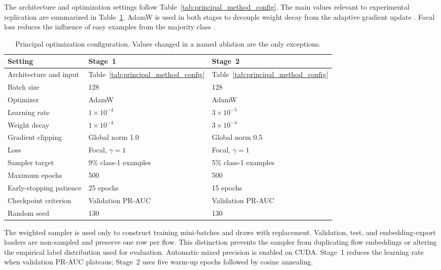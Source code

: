 The architecture and optimization settings follow
Table~\ref{tab:principal_method_config}. The main values relevant to
experimental replication are summarized in
Table~\ref{tab:experimental_training_config}. AdamW is used in both stages to
decouple weight decay from the adaptive gradient update
\cite{Loshchilov2019AdamW}. Focal loss reduces the influence of easy examples
from the majority class \cite{Lin2017FocalLoss}.

\begin{table}[t]
    \centering
    \caption{Principal optimization configuration. Values changed in a named
    ablation are the only exceptions.}
    \label{tab:experimental_training_config}
    \begin{tabular}{@{}p{3.0cm}p{4.6cm}p{5.7cm}@{}}
        \toprule
        Setting & Stage~1 & Stage~2 \\
        \midrule
        Architecture and input & Table~\ref{tab:principal_method_config} &
        Table~\ref{tab:principal_method_config} \\
        Batch size & 128 & 128 \\
        Optimizer & AdamW & AdamW \\
        Learning rate & $1\times10^{-4}$ & $3\times10^{-5}$ \\
        Weight decay & $1\times10^{-4}$ & $3\times10^{-4}$ \\
        Gradient clipping & Global norm 1.0 & Global norm 0.5 \\
        Loss & Focal, $\gamma=1$ & Focal, $\gamma=1$ \\
        Sampler target & 9\% class-1 examples & 5\% class-1 examples \\
        Maximum epochs & 500 & 500 \\
        Early-stopping patience & 25 epochs & 15 epochs \\
        Checkpoint criterion & Validation PR-AUC & Validation PR-AUC \\
        Random seed & 130 & 130 \\
        \bottomrule
    \end{tabular}
\end{table}

The weighted sampler is used only to construct training mini-batches and draws
with replacement. Validation, test, and embedding-export loaders are
non-sampled and preserve one row per flow. This distinction prevents the
sampler from duplicating flow embeddings or altering the empirical label
distribution used for evaluation. Automatic mixed precision is enabled on
CUDA. Stage~1 reduces the learning rate when validation PR-AUC plateaus;
Stage~2 uses five warm-up epochs followed by cosine annealing.

